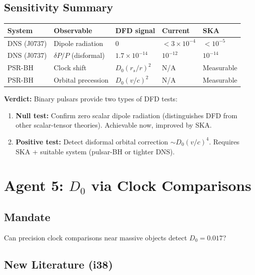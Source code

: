 \documentclass[11pt,a4paper]{article}
\begin{document}
\subsection{Sensitivity Summary}

\begin{center}
\begin{tabular}{lllll}
\toprule
\textbf{System} & \textbf{Observable} & \textbf{DFD signal} & \textbf{Current} & \textbf{SKA} \\
\midrule
DNS (J0737) & Dipole radiation & 0 & $< 3\times10^{-4}$ & $< 10^{-5}$ \\
DNS (J0737) & $\delta P/P$ (disformal) & $1.7\times10^{-14}$ & $10^{-12}$ & $10^{-14}$ \\
PSR-BH & Clock shift & $D_0(r_s/r)^2$ & N/A & Measurable \\
PSR-BH & Orbital precession & $D_0(v/c)^2$ & N/A & Measurable \\
\bottomrule
\end{tabular}
\end{center}

\textbf{Verdict:} Binary pulsars provide two types of DFD tests:
\begin{enumerate}
\item \textbf{Null test:} Confirm zero scalar dipole radiation (distinguishes DFD from other scalar-tensor theories). Achievable now, improved by SKA.
\item \textbf{Positive test:} Detect disformal orbital correction $\sim D_0(v/c)^4$. Requires SKA + suitable system (pulsar-BH or tighter DNS).
\end{enumerate}


\newpage
\section{Agent 5: $D_0$ via Clock Comparisons}
\label{sec:agent5}

\subsection{Mandate}

Can precision clock comparisons near massive objects detect $D_0 = 0.017$?

\subsection{New Literature (i38)}
\end{document}
